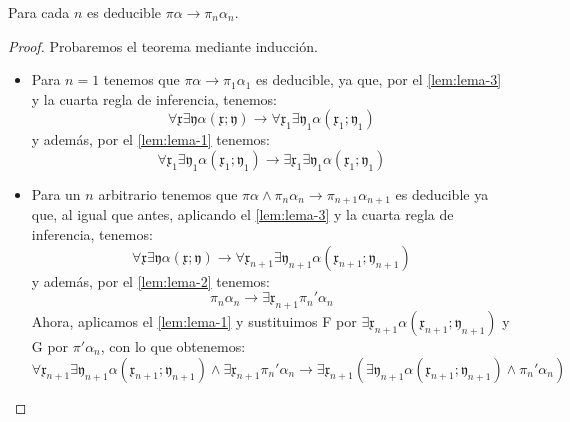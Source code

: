 \begin{teorema} \label{thm:teoremaVI}
    Para cada $n$ es deducible $\pi\alpha \rightarrow \pi_n\alpha_n$.
\end{teorema}
\begin{proof}
    Probaremos el teorema mediante inducción.
    \begin{itemize}
        \item Para $n = 1$ tenemos que $\pi\alpha \rightarrow \pi_1\alpha_1$ es deducible, ya que, por el \autoref{lem:lema-3} y la cuarta regla de inferencia, tenemos:
                \begin{equation}
                    \forall \mathfrak{x} \exists \mathfrak{y} \alpha (\mathfrak{x} ; \mathfrak{y} ) \rightarrow 
                    \forall \mathfrak{x}_1 \exists \mathfrak{y}_1 \alpha(\mathfrak{x}_1 ; \mathfrak{y}_1 )
                \end{equation}
                y además, por el \autoref{lem:lema-1} tenemos: 
                \begin{equation}
                    \forall \mathfrak{x}_1 \exists \mathfrak{y}_1 \alpha(\mathfrak{x}_1 ; \mathfrak{y}_1 ) \rightarrow  
                    \exists \mathfrak{x}_1 \exists \mathfrak{y}_1 \alpha(\mathfrak{x}_1 ; \mathfrak{y}_1 )
                \end{equation}
        \item Para un $n$ arbitrario tenemos que $\pi\alpha \wedge \pi_n\alpha_n \rightarrow \pi_{n+1}\alpha_{n+1}$ es deducible ya que, al igual que antes, 
                aplicando el \autoref{lem:lema-3} y la cuarta regla de inferencia, tenemos:
                \begin{equation} \label{eq:VI-1}
                    \forall \mathfrak{x} \exists \mathfrak{y} \alpha (\mathfrak{x} ; \mathfrak{y} ) \rightarrow 
                    \forall \mathfrak{x}_{n+1} \exists \mathfrak{y}_{n+1} \alpha(\mathfrak{x}_{n+1} ; \mathfrak{y}_{n+1} )
                \end{equation}
                y además, por el \autoref{lem:lema-2} tenemos:
                \begin{equation} \label{eq:VI-2}
                    \pi_n\alpha_n \rightarrow \exists \mathfrak{x}_{n+1} \pi_n'\alpha_n
                \end{equation}
                Ahora, aplicamos el \autoref{lem:lema-1} y sustituimos F por $\exists \mathfrak{x}_{n+1} \alpha(\mathfrak{x}_{n+1} ; \mathfrak{y}_{n+1} )$
                y G por $\pi'\alpha_{n}$, con lo que obtenemos:
                \begin{equation} \label{eq:VI-3}
                    \forall \mathfrak{x}_{n+1} \exists \mathfrak{y}_{n+1} \alpha (\mathfrak{x}_{n+1} ; \mathfrak{y}_{n+1} ) \wedge \exists \mathfrak{x}_{n+1} \pi_n'\alpha_n
                    \rightarrow  \exists \mathfrak{x}_{n+1} (\exists \mathfrak{y}_{n+1} \alpha (\mathfrak{x}_{n+1} ; \mathfrak{y}_{n+1} ) \wedge \pi_n'\alpha_n)       
                \end{equation} 


\end{itemize}
\end{proof}
